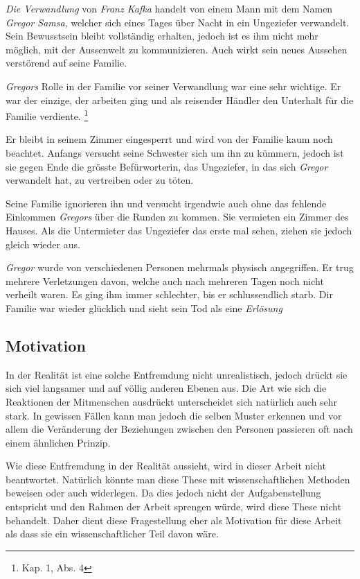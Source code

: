 \documentclass[12pt,a4paper,twoside,titlepage]{article}
\begin{document}
	\textit{Die Verwandlung} von \textit{Franz Kafka} handelt von einem Mann mit dem Namen \textit{Gregor Samsa}, welcher sich eines Tages über Nacht in ein Ungeziefer verwandelt. Sein Bewusstsein bleibt vollständig erhalten, jedoch ist es ihm nicht mehr möglich, mit der Aussenwelt zu kommunizieren. Auch wirkt sein neues Aussehen verstörend auf seine Familie.
	
	\textit{Gregors} Rolle in der Familie vor seiner Verwandlung war eine sehr wichtige. Er war der einzige, der arbeiten ging und als reisender Händler den Unterhalt für die Familie verdiente. \footnote{\cite{verwandlung} Kap. 1, Abs. 4}
	
	Er bleibt in seinem Zimmer eingesperrt und wird von der Familie kaum noch beachtet. Anfangs versucht seine Schwester sich um ihn zu kümmern, jedoch ist sie gegen Ende die grösste Befürworterin, das Ungeziefer, in das sich \textit{Gregor} verwandelt hat, zu vertreiben oder zu töten.
	
	Seine Familie ignorieren ihn und versucht irgendwie auch ohne das fehlende Einkommen \textit{Gregors} über die Runden zu kommen. Sie vermieten ein Zimmer des Hauses. Als die Untermieter das Ungeziefer das erste mal sehen, ziehen sie jedoch gleich wieder aus.
	
	\textit{Gregor} wurde von verschiedenen Personen mehrmals physisch angegriffen. Er trug mehrere Verletzungen davon, welche auch nach mehreren Tagen noch nicht verheilt waren. Es ging ihm immer schlechter, bis er schlussendlich starb. Dir Familie war wieder glücklich und sieht sein Tod als eine \textit{Erlösung}
	
	\subsection{Motivation}
	
	In der Realität ist eine solche Entfremdung nicht unrealistisch, jedoch drückt sie sich viel langsamer und auf völlig anderen Ebenen aus. Die Art wie sich die Reaktionen der Mitmenschen ausdrückt unterscheidet sich natürlich auch sehr stark. In gewissen Fällen kann man jedoch die selben Muster erkennen und vor allem die Veränderung der Beziehungen zwischen den Personen passieren oft nach einem ähnlichen Prinzip. 
	
	Wie diese Entfremdung in der Realität aussieht, wird in dieser Arbeit nicht beantwortet. Natürlich könnte man diese These mit wissenschaftlichen Methoden beweisen oder auch widerlegen. Da dies jedoch nicht der Aufgabenstellung entspricht und den Rahmen der Arbeit sprengen würde, wird diese These nicht behandelt. Daher dient diese Fragestellung eher als Motivation für diese Arbeit als dass sie ein wissenschaftlicher Teil davon wäre.
 	
\end{document}
